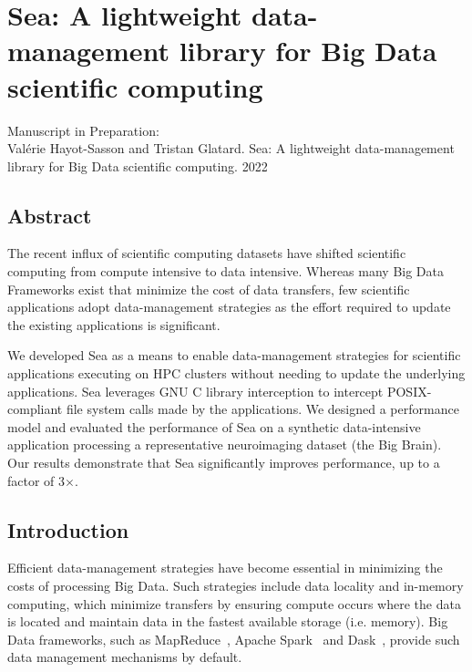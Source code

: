 \chapter{Sea: A lightweight data-management library for Big Data scientific
computing}\label{chapter:sea-comp}


Manuscript in Preparation:\\
Val\'erie Hayot-Sasson and Tristan Glatard. Sea: A lightweight data-management library for Big Data scientific
computing. 2022 \\

\section{Abstract}

The recent influx of scientific computing datasets have shifted scientific
computing from compute intensive to data intensive. Whereas many Big Data
Frameworks exist that minimize the cost of data transfers, few scientific
applications adopt data-management strategies as the effort required to update
the existing applications is significant.

We developed Sea as a means to enable data-management strategies for scientific
applications executing on HPC clusters without needing to update the underlying
applications. Sea leverages GNU C library interception to intercept
POSIX-compliant file system calls made by the applications. We designed a
performance model and evaluated the performance of Sea on a synthetic
data-intensive application processing a representative neuroimaging dataset (the
Big Brain). Our results demonstrate that Sea significantly improves performance,
up to a factor of 3$\times$. 

\section{Introduction}\label{sec:seacomp:introduction} Efficient data-management
strategies have become essential in minimizing the costs of processing Big Data.
Such strategies include data locality and in-memory computing, which minimize
transfers by ensuring compute occurs where the data is located and maintain data
in the fastest available storage (i.e. memory). Big Data frameworks, such as
MapReduce~\cite{dean2008mapreduce}, Apache Spark~\cite{zaharia2016apache} and
Dask~\cite{rocklin2015dask}, provide such data management mechanisms by default.

